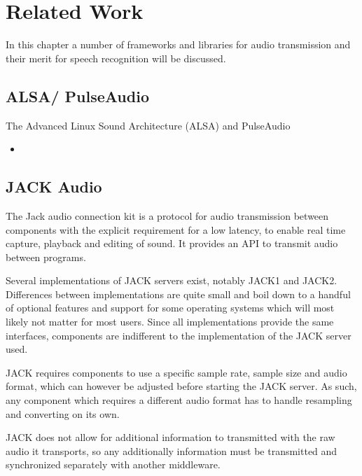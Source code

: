 
\chapter{Related Work}

In this chapter a number of frameworks and libraries for audio transmission and their merit for speech recognition will be discussed.

\section{ALSA/ PulseAudio}
The Advanced Linux Sound Architecture (ALSA) and PulseAudio 

\begin{itemize}
	\item 
\end{itemize}

\section{JACK Audio}

The Jack audio connection kit \cite{JACK} is a protocol for audio transmission between components with the explicit requirement for a low latency, to enable real time capture, playback and editing of sound. 
It provides an API to transmit audio between programs. 

Several implementations of JACK servers exist, notably JACK1 and JACK2. 
Differences between implementations are quite small and boil down to a handful of optional features and support for some operating systems which will most likely not matter for most users. %
Since all implementations provide the same interfaces, components are indifferent to the implementation of the JACK server used. 

JACK requires components to use a specific sample rate, sample size and audio format, which can however be adjusted before starting the JACK server. 
As such, any component which requires a different audio format has to handle resampling and converting on its own. 

JACK does not allow for additional information to transmitted with the raw audio it transports, so any additionally information must be transmitted and synchronized separately with another middleware. 

